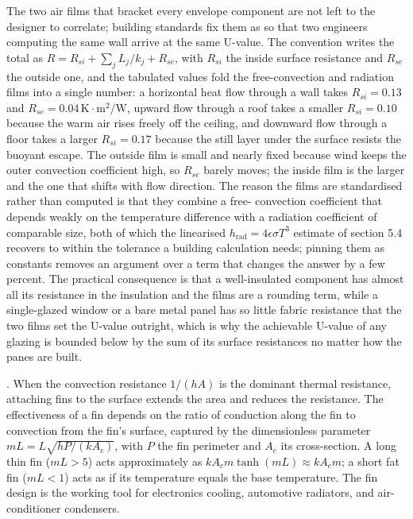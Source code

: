 The two air films that bracket every envelope component are not left to the
designer to correlate; building standards fix them as  so that two engineers computing the same wall arrive at
the same U-value. The convention writes the total as $R = R_{si} + \sum_j
L_j/k_j + R_{se}$, with $R_{si}$ the inside surface resistance and $R_{se}$
the outside one, and the tabulated values fold the free-convection and
radiation films into a single number: a horizontal heat flow through a wall
takes $R_{si} = 0.13$ and $R_{se} = 0.04\,\si{\kelvin}\cdot\text{m}^2/\text{W}$,
upward flow through a roof takes a smaller $R_{si} = 0.10$ because the warm air
rises freely off the ceiling, and downward flow through a floor takes a larger
$R_{si} = 0.17$ because the still layer under the surface resists the buoyant
escape. The outside film is small and nearly fixed because wind keeps the
outer convection coefficient high, so $R_{se}$ barely moves; the inside film
is the larger and the one that shifts with flow direction. The reason the
films are standardised rather than computed is that they combine a free-
convection coefficient that depends weakly on the temperature difference with
a radiation coefficient of comparable size, both of which the linearised
$h_{\text{rad}} = 4\epsilon\sigma T^3$ estimate of section 5.4 recovers to
within the tolerance a building calculation needs; pinning them as constants
removes an argument over a term that changes the answer by a few percent. The
practical consequence is that a well-insulated component has almost all its
resistance in the insulation and the films are a rounding term, while a
single-glazed window or a bare metal panel has so little fabric resistance
that the two films set the U-value outright, which is why the achievable
U-value of any glazing is bounded below by the sum of its surface resistances
no matter how the panes are built.

. When the convection resistance
$1/(hA)$ is the dominant thermal resistance, attaching fins to the
surface extends the area and reduces the resistance. The
effectiveness of a fin depends on the ratio of conduction along the
fin to convection from the fin's surface, captured by the
dimensionless parameter $mL = L\sqrt{hP/(kA_c)}$, with $P$ the fin
perimeter and $A_c$ its cross-section. A long thin fin ($mL > 5$)
acts approximately as $kA_c m \tanh(mL) \approx kA_c m$; a short fat
fin ($mL < 1$) acts as if its temperature equals the base
temperature. The fin design is the working tool for electronics
cooling, automotive radiators, and air-conditioner condensers.

